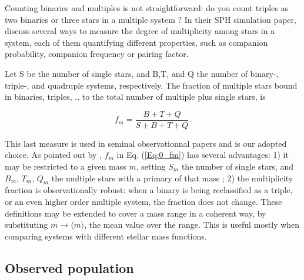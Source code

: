 Counting binaries and multiples is not straightforward: do you count triples as two binaries or three stars in a multiple system ? In their SPH simulation paper, \cite{Goodwin2004a} discuss several ways to measure the degree of multiplicity among stars in a system, each of them quantifying different properties, such as companion probability, companion frequency or pairing factor. 

Let  S be the number of single stars, and B,T, and Q the number of binary-, triple-, and quadruple systems, respectively. The fraction of multiple stars bound in binaries, triples, .. to the total number of multiple plus single stars, is

\begin{equation}
\label{Eq:0_fm} 
f_m = \frac{B + T + Q}{S + B + T + Q}. 
\end{equation}

This last  measure is used in seminal observationnal papers \citep{DM91,Raghavan2010} and is our adopted choice. As pointed out by \cite{Hubber2005}, $f_m$ in Eq. (\ref{Eq:0_fm}) has several advantages: 1) it  may be  restricted to a given mass $m$, setting  $S_m$ the number of single stars, and $B_m,\, T_m,\, Q_m$  the multiple stars with a primary of that mass ;  2)  the multiplicity fraction is observationally robust: when a binary is being reclassified as a triple, or an even higher order multiple system, the fraction does not change. 
 These definitions may be extended to cover a mass range  in a coherent way, by substituting $m \rightarrow \langle m\rangle$, the mean value over the range. This is useful mostly when comparing  systems with different stellar mass functions. 


\subsection{Observed population}
\label{Sec:0_raghavan}

